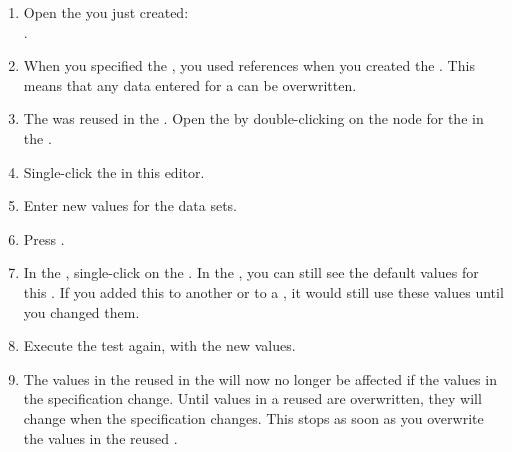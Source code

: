 \begin{enumerate}
\item Open the \gdproject{} you just created:\\ . 
\item When you specified the  \gdcase{}, you  used references when you created the \gdsteps{}. This means that any data entered for a \gdcase{} can be overwritten.  
\item The \gdcase{} was reused in the \gdsuite{}. Open the \gdtestsuiteeditor{} by double-clicking on the node for the \gdsuite{} in the \gdtestsuitebrowser{}. 
\item Single-click the \gdcase{} in this editor. 
\item Enter new values for the data sets. 
\item Press . 
\item In the \gdtestcasebrowser{}, single-click on the  \gdcase{}. In the \gddatasetsview{}, you can still see the default values for this \gdcase{}. If you added this \gdcase{} to another \gdcase{} or to a \gdsuite{}, it would still use these values until you changed them. 
\item Execute the test again, with the new values. 
\item The values in the \gdcase{} reused in the \gdsuite{} will now no longer be affected if the values in the specification change. Until values in a reused \gdcase{} are overwritten, they will change when the specification changes. This stops as soon as you overwrite the values in the reused \gdcase{}. 
\end{enumerate}
